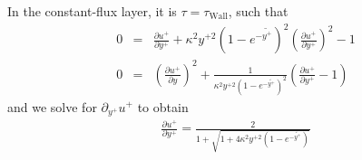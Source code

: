 \documentclass[a4paper,12pt]{article}
\newcommand{\p}{\partial}
\begin{document}
In the constant-flux layer, it is $\tau=\tau_\text{Wall}$, such that
\begin{eqnarray}
  0 &=&  \frac{\p u^+}{\p y^+} + \kappa^2 y^{+2} \left(1- e^{-\widetilde{y^+}}\right)^2 \left(\frac{\p u^+}{\p y^+} \right)^2 - 1 \\ 
  0 &=&  \left(\frac{\p u^+}{\p y} \right)^2 + \frac{1}{\kappa^2 y^{+2}\left(1-e^{-\widetilde{y^+}}\right)^2} \left(\frac{\p u^+}{\p y^+} -1\right)
\end{eqnarray}
and we solve for $\p_{y^+}u^+$ to obtain 
\begin{eqnarray} 
  \frac{\p u^+}{\p y^+} = \frac{2}{1+\sqrt{1+4 \kappa^2 y^{+2}\left(1-e^{-\widetilde{y^+}}\right)}} 
\end{eqnarray}
\end{document}
